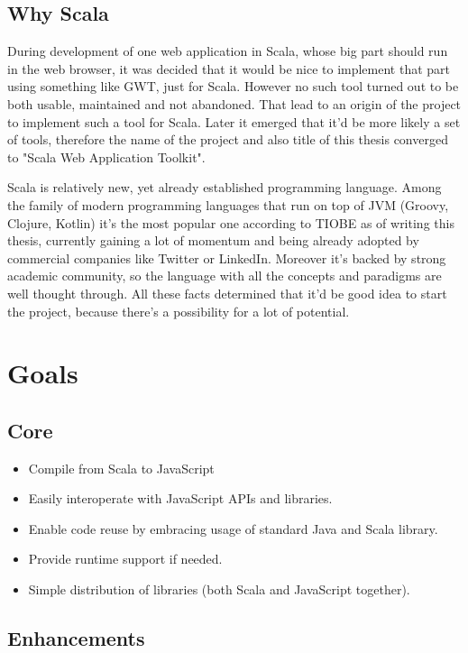 \documentclass[12pt,a4paper]{report}
\begin{document}
\subsection{Why Scala}

During development of one web application in Scala, whose big part should run in the web browser, it was decided that it would be nice to implement that part using something like GWT, just for Scala. However no such tool turned out to be both usable, maintained and not abandoned. That lead to an origin of the project to implement such a tool for Scala. Later it emerged that it'd be more likely a set of tools, therefore the name of the project and also title of this thesis converged to "Scala Web Application Toolkit".

Scala is relatively new, yet already established programming language. Among the family of modern programming languages that run on top of JVM (Groovy, Clojure, Kotlin) it's the most popular one according to TIOBE as of writing this thesis, currently gaining a lot of momentum and being already adopted by commercial companies like Twitter or LinkedIn. Moreover it's backed by strong academic community, so the language with all the concepts and paradigms are well thought through. All these facts determined that it'd be good idea to start the project, because there's a possibility for a lot of potential.

\section{Goals}

\subsection{Core}

\begin{itemize}
\item Compile from Scala to JavaScript
\item Easily interoperate with JavaScript APIs and libraries.
\item Enable code reuse by embracing usage of standard Java and Scala library.
\item Provide runtime support if needed.
\item Simple distribution of libraries (both Scala and JavaScript together). 
\end{itemize}

\subsection{Enhancements}
\end{document}
